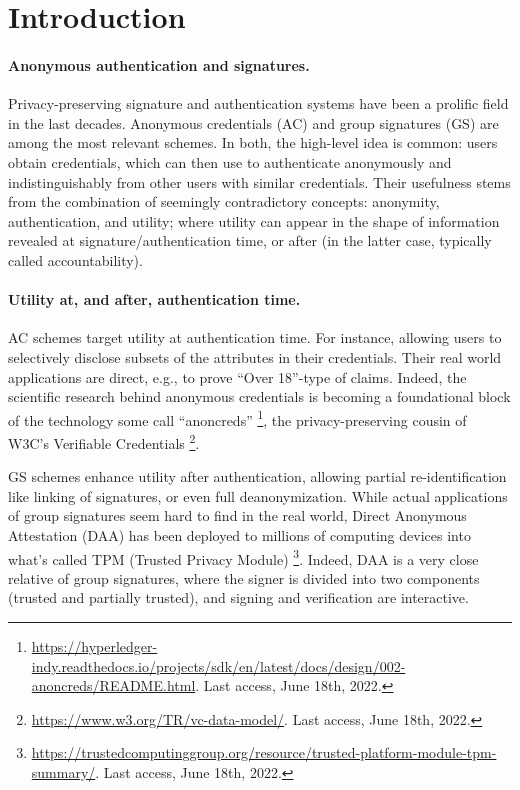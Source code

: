 \section{Introduction}
\label{sec:introduction}


\paragraph{Anonymous authentication and signatures.} %
Privacy-preserving signature and authentication systems have been a prolific
field in the last decades. Anonymous credentials (AC) \cite{chau85} and group
signatures (GS) \cite{ch91} are among the most relevant schemes. In both, the
high-level idea is common: users obtain credentials, which can then use to
authenticate anonymously and indistinguishably from other users with similar
credentials. 
%
Their usefulness stems from the combination of seemingly contradictory concepts:
anonymity, authentication, and utility; where utility can appear in the shape of
information revealed at signature/authentication time, or after (in the latter
case, typically called accountability).

\paragraph{Utility at, and after, authentication time.} %
AC schemes target utility at authentication time. For instance, allowing
users to selectively disclose subsets of the attributes in their credentials.
Their real world applications are direct, e.g., to prove ``Over 18''-type of
claims. Indeed, the scientific research behind anonymous credentials is becoming
a foundational block of the technology some call ``anoncreds''%
\footnote{\url{https://hyperledger-indy.readthedocs.io/projects/sdk/en/latest/docs/design/002-anoncreds/README.html}. Last access, June 18th, 2022.},
the privacy-preserving cousin of W3C's Verifiable Credentials%
\footnote{\url{https://www.w3.org/TR/vc-data-model/}. Last access, June 18th,
  2022.}.

GS schemes enhance utility after authentication, allowing partial
re-identification like linking of signatures, or even full deanonymization.
While actual applications of group signatures seem hard to find in the real
world, Direct Anonymous Attestation (DAA) \cite{bcc04,bl07,cdl16b} has been
deployed to millions of computing devices into what's called TPM (Trusted
Privacy Module)%
\footnote{\url{https://trustedcomputinggroup.org/resource/trusted-platform-module-tpm-summary/}. Last access, June 18th, 2022.}.
Indeed, DAA is a very close relative of group signatures, where the signer is
divided into two components (trusted and partially trusted), and signing
and verification are interactive.

